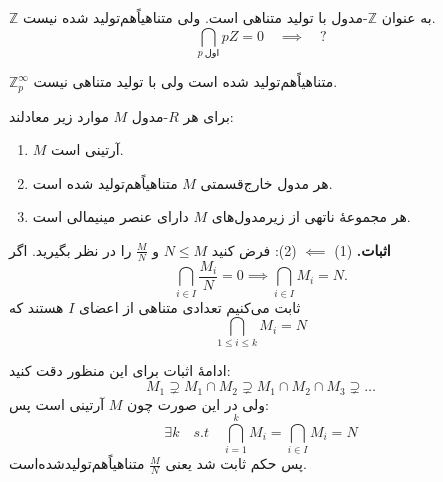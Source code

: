 \section{}

\begin{frame}
    \begin{example}
        $\mathbb{Z}$ به عنوان $\mathbb{Z}$-مدول با تولید متناهی است.
        ولی متناهیاًهم‌تولید شده نیست.
        \[
            \bigcap_{p\ \text{اول}} pZ = 0 \quad \implies \quad ?
        \]

    \end{example}
    \begin{example}
        $\mathbb{Z}_p^\infty$ متناهیاًهم‌تولید شده است ولی با تولید متناهی نیست.
    \end{example}
\end{frame}

\begin{frame}
    \begin{theorem}
        برای هر $R$-مدول $M$ موارد زیر معادلند:
        \begin{enumerate}
            \item $M$ آرتینی است.
            \item هر مدول خارج‌قسمتی $M$  متناهیاًهم‌تولید شده است.
            \item هر مجموعهٔ ناتهی از زیرمدول‌های $M$ دارای عنصر مینیمالی است.
        \end{enumerate}
    \end{theorem}
    \textbf{اثبات.} (1) $\impliedby$ (2):
    فرض کنید $N \leqslant M$ و $\frac{M}{N}$ را در نظر بگیرید. اگر
    \[
        \bigcap_{i\in I} \frac{M_i}{N} = 0 \implies \bigcap_{i\in I} M_i = N.
    \]
    ثابت می‌کنیم تعدادی متناهی از اعضای
    $I$
    هستند که
    \[
        \bigcap_{1 \leqslant i \leqslant k} M_i = N
    \]
\end{frame}



\begin{frame}{ادامهٔ اثبات}
    برای این منظور دقت کنید:
    \[
        M_1 \supsetneq M_1 \cap M_2 \supsetneq M_1 \cap M_2 \cap M_3 \supsetneq \dots
    \]
    ولی در این صورت چون $M$ آرتینی است پس:
    \[
        \exists k \quad s.t \quad \bigcap_{i=1}^k M_i = \bigcap_{i\in I} M_i = N
    \]
    پس حکم ثابت شد یعنی $\frac{M}{N}$ متناهیاًهم‌تولید‌شده‌است.

\end{frame}


